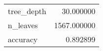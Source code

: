 \begin{tabular}{lr}
\toprule
 &  \\
\midrule
tree\_depth & 30.000000 \\
n\_leaves & 1567.000000 \\
accuracy & 0.892899 \\
\bottomrule
\end{tabular}